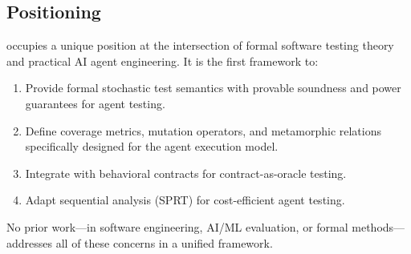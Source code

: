 \subsection{Positioning}
\label{sec:related:positioning}

\agentassay{} occupies a unique position at the intersection of formal
software testing theory and practical AI agent engineering. It is the
first framework to:
\begin{enumerate}[leftmargin=*]
  \item Provide formal stochastic test semantics with provable soundness
    and power guarantees for agent testing.
  \item Define coverage metrics, mutation operators, and metamorphic
    relations specifically designed for the agent execution model.
  \item Integrate with behavioral contracts for contract-as-oracle testing.
  \item Adapt sequential analysis (SPRT) for cost-efficient agent testing.
\end{enumerate}

No prior work---in software engineering, AI/ML evaluation, or formal
methods---addresses all of these concerns in a unified framework.
